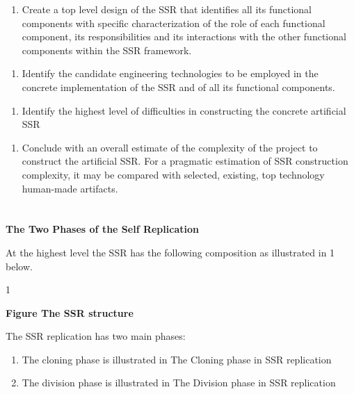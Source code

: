 \documentclass[letterpaper]{article}
\begin{document}
\bigskip

\begin{enumerate}
\item  Create a top level design of the SSR that identifies all its
functional components with specific characterization of the role of
each functional component, its responsibilities and its interactions
with the other functional components within the SSR framework.
\end{enumerate}

\bigskip

\begin{enumerate}
\item  Identify the candidate engineering technologies to be employed in
the concrete implementation of the SSR and of all its functional
components.
\end{enumerate}

\bigskip

\begin{enumerate}
\item  Identify the highest level of difficulties in constructing the
concrete artificial SSR
\end{enumerate}

\bigskip

\begin{enumerate}
\item  Conclude with an overall estimate of the complexity of the
project to construct the artificial SSR. For a pragmatic estimation of
SSR construction complexity, it may be compared with selected,
existing, top technology human-made artifacts.
\end{enumerate}
\section[]{\color{black} }

\bigskip

{\bfseries
\hypertarget{RefHeading3044306210128}{}The Two Phases of the Self
Replication}

At the highest level the SSR has the following composition as
illustrated in 1 below.

 1

{\bfseries
\label{bkm:Ref331099850}Figure  The SSR structure}


\bigskip

The SSR replication has two main phases:

\begin{enumerate}
\item The cloning phase is illustrated in  The Cloning phase in SSR
replication
\item The division phase is illustrated in  The Division phase in SSR
replication
\end{enumerate}
\end{document}
